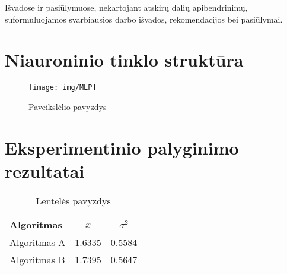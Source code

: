 \documentclass{VUMIFInfKursinis}
\begin{document}
Išvadose ir pasiūlymuose, nekartojant atskirų dalių apibendrinimų,
suformuluojamos svarbiausios darbo išvados, rekomendacijos bei pasiūlymai.

\printbibliography[heading=bibintoc] %

\appendix  %

\section{Niauroninio tinklo struktūra}
\begin{figure}[H]
    \centering
    \texttt{[image: img/MLP]}
    \caption{Paveikslėlio pavyzdys}   %
    \label{img:mlp}
\end{figure}


\section{Eksperimentinio palyginimo rezultatai}
\begin{table}[H]\footnotesize
  \centering
  \caption{Lentelės pavyzdys}    %
  {\begin{tabular}{|l|c|c|} \hline
    Algoritmas & $\bar{x}$ & $\sigma^{2}$ \\
    \hline
    Algoritmas A  & 1.6335    & 0.5584       \\
    Algoritmas B  & 1.7395    & 0.5647       \\
    \hline
  \end{tabular}}
  \label{tab:table example}
\end{table}
\end{document}
